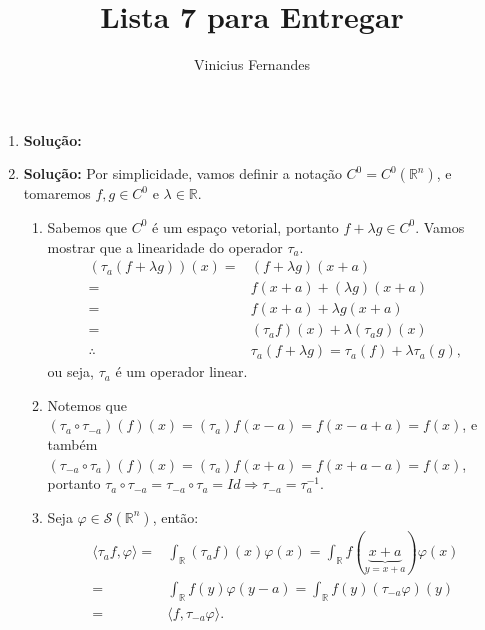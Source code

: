 \documentclass{article}
\begin{document}
	
	\title{Lista 7 para Entregar}
	\author{Vinicius Fernandes}
	
	\maketitle
	
	\begin{enumerate}
		
		\item \textbf{Solução:}
		 
		\item \textbf{Solução:} Por simplicidade, vamos definir a notação $C^{0} = C^{0}(\mathbb{R}^{n})$, e tomaremos $f, g \in C^{0}$ e $\lambda \in \mathbb{R}$.
			\begin{enumerate}
				\item Sabemos que $C^{0}$ é um espaço vetorial, portanto $f + \lambda g \in C^{0}$. Vamos mostrar que a linearidade do operador $\tau_{a}$.
				$$
				\begin{aligned}
				(\tau_{a}(f+\lambda g))(x) = &  (f+\lambda g)(x+a) \\
				= & f(x+a) +(\lambda g)(x+a)
				\\
				= & f(x+a) +\lambda g(x+a)
				\\
				= & (\tau_{a}f)(x) +\lambda (\tau_{a}g)(x)
				\\
				\therefore & \tau_{a}(f+\lambda g) = \tau_{a}(f)+\lambda \tau_{a}(g),
				\end{aligned}
				$$
				ou seja, $\tau_{a}$ é um operador linear.
				
				\item Notemos que $(\tau_{a} \circ \tau_{-a})(f)(x) = (\tau_{a})f(x-a) = f(x- a+a) = f(x)$, e também $(\tau_{-a} \circ \tau_{a})(f)(x) = (\tau_{a})f(x+a) = f(x+a-a) = f(x)$, portanto $\tau_{a} \circ \tau_{-a} = \tau_{-a} \circ \tau_{a} = Id \Rightarrow \tau_{-a} = \tau^{-1}_{a}$.
				
				\item Seja $\varphi \in \mathcal{S}(\mathbb{R}^{n})$, então:
				$$
				\begin{aligned}
				\langle \tau_{a}f, \varphi \rangle = & \int_{\mathbb{R}} (\tau_{a}f)(x)\varphi(x)
				= \int_{\mathbb{R}} f(\underbrace{ x+a }_{y = x+a}) \varphi(x)
				\\
				= & \int_{\mathbb{R}} f(y)\varphi(y-a)
				=  \int_{\mathbb{R}} f(y) (\tau_{-a}\varphi)(y) 
				\\
				= & \langle f, \tau_{-a}\varphi \rangle.
				\end{aligned}
				$$
				

\end{enumerate}
\end{enumerate}
\end{document}
